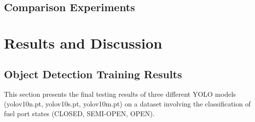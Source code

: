 \documentclass[12pt,oneside]{book} %
\begin{document}
\section{Comparison Experiments}

\chapter{Results and Discussion}\label{chap:results}

\section{Object Detection Training Results}

This section presents the final testing results of three different YOLO models
(yolov10n.pt, yolov10s.pt, yolov10m.pt) on a dataset involving the
classification of fuel port states (CLOSED, SEMI-OPEN, OPEN).
\end{document}
